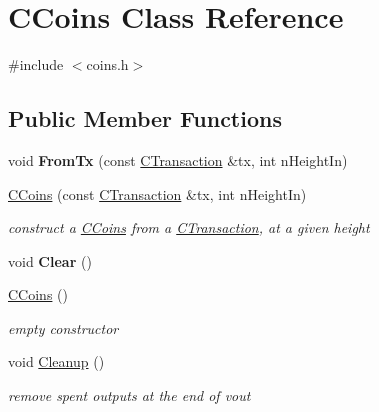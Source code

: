 \hypertarget{class_c_coins}{}\section{C\+Coins Class Reference}
\label{class_c_coins}


{\ttfamily \#include $<$coins.\+h$>$}

\subsection*{Public Member Functions}
\begin{DoxyCompactItemize}
\item 
\mbox{\label{class_c_coins_abf67e501a1d207c892c1f52dd383956e}} 
void {\bfseries From\+Tx} (const \mbox{\hyperlink{class_c_transaction}{C\+Transaction}} \&tx, int n\+Height\+In)
\item 
\mbox{\label{class_c_coins_a303f3b245c339c11a1ea4318b01ec290}} 
\mbox{\hyperlink{class_c_coins_a303f3b245c339c11a1ea4318b01ec290}{C\+Coins}} (const \mbox{\hyperlink{class_c_transaction}{C\+Transaction}} \&tx, int n\+Height\+In)
\begin{DoxyCompactList}\small\item\em construct a \mbox{\hyperlink{class_c_coins}{C\+Coins}} from a \mbox{\hyperlink{class_c_transaction}{C\+Transaction}}, at a given height \end{DoxyCompactList}\item 
\mbox{\label{class_c_coins_a4d4197688436b752234bea95f0230b82}} 
void {\bfseries Clear} ()
\item 
\mbox{\label{class_c_coins_a543757065d6c77d23953a33eecb31a46}} 
\mbox{\hyperlink{class_c_coins_a543757065d6c77d23953a33eecb31a46}{C\+Coins}} ()
\begin{DoxyCompactList}\small\item\em empty constructor \end{DoxyCompactList}\item 
\mbox{\label{class_c_coins_a7cfa2efc07f4d35785c9c75caa8bddcb}} 
void \mbox{\hyperlink{class_c_coins_a7cfa2efc07f4d35785c9c75caa8bddcb}{Cleanup}} ()
\begin{DoxyCompactList}\small\item\em remove spent outputs at the end of vout \end{DoxyCompactList}\item 

\end{DoxyCompactItemize}
